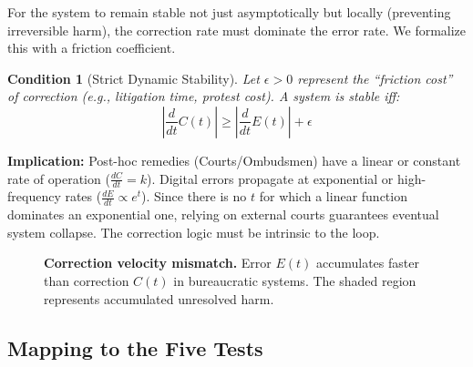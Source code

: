 \documentclass{article}
\newtheorem{condition}{Condition}
\begin{document}
For the system to remain stable not just asymptotically but locally (preventing irreversible harm), the correction rate must dominate the error rate. We formalize this with a friction coefficient.

\begin{condition}[Strict Dynamic Stability]
\label{cond:friction}
Let $\epsilon > 0$ represent the ``friction cost'' of correction (e.g., litigation time, protest cost). A system is stable iff:
\begin{equation}
\left| \frac{d}{dt} C(t) \right| \ge \left| \frac{d}{dt} E(t) \right| + \epsilon
\end{equation}
\end{condition}

\textbf{Implication:} Post-hoc remedies (Courts/Ombudsmen) have a linear or constant rate of operation ($\frac{dC}{dt} = k$). Digital errors propagate at exponential or high-frequency rates ($\frac{dE}{dt} \propto e^{t}$). Since there is no $t$ for which a linear function dominates an exponential one, relying on external courts guarantees eventual system collapse. The correction logic must be intrinsic to the loop.

\begin{figure}[htbp]
\centering
{}
\caption{\textbf{Correction velocity mismatch.} Error $E(t)$ accumulates faster than correction $C(t)$ in bureaucratic systems. The shaded region represents accumulated unresolved harm.}
\label{fig:velocity-mismatch}
\end{figure}

\subsection{Mapping to the Five Tests}
\end{document}
